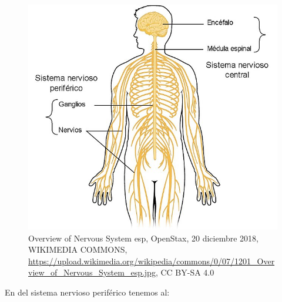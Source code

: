\begin{figure}[h]
 \centering
 \includegraphics[scale=0.5]{../Figuras/Nervous_System.jpg}
 \caption{Overview of Nervous System esp, OpenStax, 20 diciembre 2018, WIKIMEDIA COMMONS, \url{https://upload.wikimedia.org/wikipedia/commons/0/07/1201_Overview_of_Nervous_System_esp.jpg}, CC BY-SA 4.0}
 \label{fig:SNCySNP}
\end{figure}


En del sistema nervioso periférico tenemos al:


